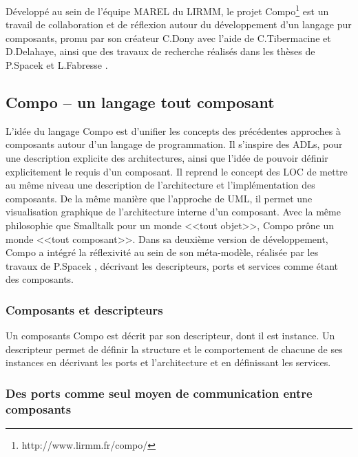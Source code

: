     
    \label{sec:compo} 

    Développé au sein de l'équipe MAREL du LIRMM, le projet Compo\footnote{http://www.lirmm.fr/compo/} est un travail de collaboration et de réflexion autour du développement d'un langage pur composants, promu par son créateur C.Dony avec l'aide de C.Tibermacine et D.Delahaye, ainsi que des travaux de recherche réalisés dans les thèses de P.Spacek \cite{Spacek:2014:CMA:2602458.2602476} et L.Fabresse \cite{fabresse2007decoupage}.
    
    \subsection{Compo -- un langage tout composant}
    
L'idée du langage Compo est d'unifier les concepts des précédentes approches à composants autour d'un langage de programmation. Il s'inspire des ADLs, pour une description explicite des architectures, ainsi que l'idée de pouvoir définir explicitement le requis d'un composant. Il reprend le concept des LOC de mettre au même niveau une description de l'architecture et l'implémentation des composants. De la même manière que l'approche de UML, il permet une visualisation graphique de l'architecture interne d'un composant. Avec la même philosophie que Smalltalk pour un monde <<tout objet>>, Compo prône un monde <<tout composant>>. Dans sa deuxième version de développement, Compo a intégré la réflexivité au sein de son méta-modèle, réalisée par les travaux de P.Spacek \cite{Spacek:2014:CMA:2602458.2602476}, décrivant les descripteurs, ports et services comme étant des composants. 
  
      \subsubsection{Composants et descripteurs}
    
    Un composants Compo est décrit par son descripteur, dont il est instance. Un descripteur permet de définir la structure et le comportement de chacune de ses instances en décrivant les ports et l'architecture et en définissant les services. 
    
      \subsubsection{Des ports comme seul moyen de communication entre composants}
      
